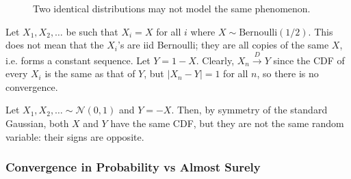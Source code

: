 \begin{figure}[H]
    \caption{Two identical distributions may not model the same phenomenon.} 
    \label{fig:prob_in_dist}
  \end{figure}

  \begin{example}
    Let $X_1, X_2, \ldots$ be such that $X_i = X$ for all $i$ where $X \sim \mathrm{Bernoulli}(1/2)$. This does not mean that the $X_i$'s are iid Bernoulli; they are all copies of the same $X$, i.e. forms a constant sequence. Let $Y = 1 - X$. Clearly, $X_n \xrightarrow{D} Y$ since the CDF of every $X_i$ is the same as that of $Y$, but $|X_n - Y| = 1$ for all $n$, so there is no convergence.  
  \end{example}

  \begin{example}
    Let $X_1, X_2, \ldots \sim \mathcal{N}(0, 1)$ and $Y = -X$. Then, by symmetry of the standard Gaussian, both $X$ and $Y$ have the same CDF, but they are not the same random variable: their signs are opposite. 
  \end{example}

  \subsubsection{Convergence in Probability vs Almost Surely} 

